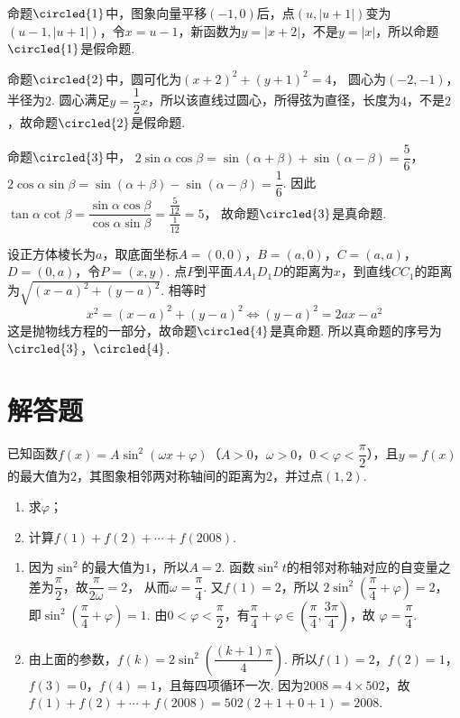 \begin{solution}
命题\(\circled{1}\)中，图象向量平移\((-1,0)\)后，点\((u,|u+1|)\)变为\((u-1,|u+1|)\)，令\(x=u-1\)，新函数为\(y=|x+2|\)，不是\(y=|x|\)，所以命题\(\circled{1}\)是假命题.

命题\(\circled{2}\)中，圆可化为\((x+2)^2+(y+1)^2=4\)，
圆心为\((-2,-1)\)，半径为\(2\). 圆心满足\(y=\dfrac12x\)，所以该直线过圆心，所得弦为直径，长度为\(4\)，不是\(2\)，故命题\(\circled{2}\)是假命题.

命题\(\circled{3}\)中，
\(2\sin\alpha\cos\beta=\sin(\alpha+\beta)+\sin(\alpha-\beta)=\dfrac56\)，
\(2\cos\alpha\sin\beta=\sin(\alpha+\beta)-\sin(\alpha-\beta)=\dfrac16\).
因此\(\tan\alpha\cot\beta=\dfrac{\sin\alpha\cos\beta}{\cos\alpha\sin\beta}=\dfrac{\frac{5}{12}}{\frac{1}{12}}=5\)，
故命题\(\circled{3}\)是真命题.

设正方体棱长为\(a\)，取底面坐标\(A=(0,0)\)，\(B=(a,0)\)，\(C=(a,a)\)，\(D=(0,a)\)，令\(P=(x,y)\). 点\(P\)到平面\(AA_1D_1D\)的距离为\(x\)，到直线\(CC_1\)的距离为\(\sqrt{(x-a)^2+(y-a)^2}\). 相等时
\[
x^2=(x-a)^2+(y-a)^2
\Longleftrightarrow
(y-a)^2=2ax-a^2
\]
这是抛物线方程的一部分，故命题\(\circled{4}\)是真命题. 所以真命题的序号为\(\circled{3}\)，\(\circled{4}\).
\end{solution}

\section{解答题}

\begin{problem}
已知函数\(f(x)=A\sin^2(\omega x+\varphi)\)（\(A>0\)，\(\omega>0\)，\(0<\varphi<\dfrac{\pi}{2}\)），且\(y=f(x)\)的最大值为\(2\)，其图象相邻两对称轴间的距离为\(2\)，并过点\((1,2)\).

\begin{enumerate}
\item 求\(\varphi\)；
\item 计算\(f(1)+f(2)+\cdots+f(2008)\).
\end{enumerate}
\end{problem}

\begin{solution}
\begin{enumerate}
\item 因为\(\sin^2\)的最大值为\(1\)，所以\(A=2\). 函数\(\sin^2 t\)的相邻对称轴对应的自变量之差为\(\dfrac{\pi}{2}\)，故\(\dfrac{\pi}{2\omega}=2\)，
从而\(\omega=\dfrac{\pi}{4}\). 又\(f(1)=2\)，所以
\(2\sin^2\left(\dfrac{\pi}{4}+\varphi\right)=2\)，
即\(\sin^2\left(\dfrac{\pi}{4}+\varphi\right)=1\). 由\(0<\varphi<\dfrac{\pi}{2}\)，有\(\dfrac{\pi}{4}+\varphi\in\left(\dfrac{\pi}{4},\dfrac{3\pi}{4}\right)\)，故
\(\varphi=\dfrac{\pi}{4}\).

\item 由上面的参数，\(f(k)=2\sin^2\left(\dfrac{(k+1)\pi}{4}\right)\). 所以\(f(1)=2\)，\(f(2)=1\)，\(f(3)=0\)，\(f(4)=1\)，且每四项循环一次. 因为\(2008=4\times502\)，故\(f(1)+f(2)+\cdots+f(2008)=502(2+1+0+1)=2008\).
\end{enumerate}
\end{solution}

